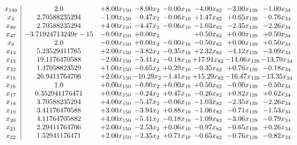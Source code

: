 \documentclass[8pt]{article}
\begin{document}
\[\begin{array}{c| c c@{\hskip 2pt} c@{\hskip 2pt} c@{\hskip 2pt} c@{\hskip 2pt} c@{\hskip 2pt} c@{\hskip 2pt} }
 x_{149}   &  2.0 & +  8.00 x_{150} & -8.00 x_{2} & -0.00 x_{10} & -4.00 x_{82} & -3.00 x_{139} & -1.00 x_{34}\\
 x_{4}   &  2.70588235294 & -1.00 x_{150} & -0.47 x_{2} & -0.06 x_{10} & +  1.47 x_{82} & +  0.65 x_{139} & -0.76 x_{34}\\
 x_{80}   &  2.70588235294 & +  4.00 x_{150} & -4.47 x_{2} & -0.06 x_{10} & -1.03 x_{82} & -2.35 x_{139} & -2.26 x_{34}\\
 x_{47}   &  -3.71924713249e-15 & -0.00 x_{150} & +  0.00 x_{2} &   & +  0.50 x_{82} & +  0.00 x_{139} & +  0.50 x_{34}\\
 x_{6}   &  2.0 & -0.00 x_{150} & +  0.00 x_{2} & -0.00 x_{10} & -0.50 x_{82} & +  0.00 x_{139} & +  0.50 x_{34}\\
 x_{12}   &  5.23529411765 & +  2.00 x_{150} & -3.82 x_{2} & -0.35 x_{10} & +  2.32 x_{82} & -4.12 x_{139} & -3.09 x_{34}\\
 x_{13}   &  19.1176470588 & -2.00 x_{150} & -5.41 x_{2} & -0.18 x_{10} & + 17.91 x_{82} & -14.06 x_{139} & -13.79 x_{34}\\
 x_{33}   &  1.47058823529 & +  1.00 x_{150} & -0.65 x_{2} & +  0.29 x_{10} & -0.35 x_{82} & +  0.76 x_{139} & -0.18 x_{34}\\
 x_{15}   &  20.9411764706 & +  2.00 x_{150} & -10.29 x_{2} & -1.41 x_{10} & + 15.29 x_{82} & -16.47 x_{139} & -13.35 x_{34}\\
 x_{16}   &  1.0 & +  0.00 x_{150} & -0.00 x_{2} & +  0.00 x_{10} & +  0.50 x_{82} & -0.00 x_{139} & -0.50 x_{34}\\
 x_{17}   &  0.352941176471 & +  0.00 x_{150} & -0.24 x_{2} & +  0.47 x_{10} & -0.26 x_{82} & +  0.82 x_{139} & +  0.62 x_{34}\\
 x_{14}   &  3.70588235294 & +  4.00 x_{150} & -5.47 x_{2} & -0.06 x_{10} & -1.03 x_{82} & -2.35 x_{139} & -2.26 x_{34}\\
 x_{19}   &  3.41176470588 & +  3.00 x_{150} & -3.94 x_{2} & +  0.88 x_{10} & -1.06 x_{82} & -0.71 x_{139} & -1.53 x_{34}\\
 x_{20}   &  4.11764705882 & +  4.00 x_{150} & -5.41 x_{2} & -0.18 x_{10} & -1.09 x_{82} & -3.06 x_{139} & -0.79 x_{34}\\
 x_{21}   &  2.29411764706 & +  2.00 x_{150} & -2.53 x_{2} & +  0.06 x_{10} & -0.97 x_{82} & -0.65 x_{139} & +  0.26 x_{34}\\
 x_{22}   &  1.52941176471 & +  2.00 x_{150} & -2.35 x_{2} & +  0.71 x_{10} & -0.65 x_{82} & -0.76 x_{139} & -0.82 x_{34}\\

\end{array}\]
\end{document}
